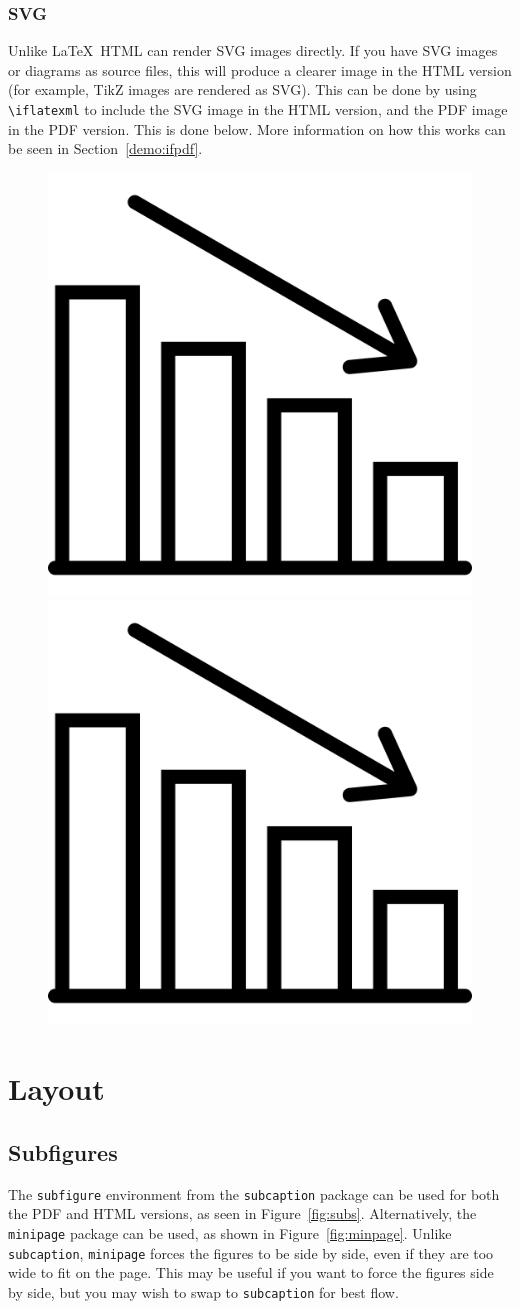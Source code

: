 \subsubsection{SVG}
\label{demo:fig:svg}

Unlike \LaTeX\, HTML can render SVG images directly. If you have SVG images or diagrams as source files, this will produce a clearer image in the HTML version (for example, TikZ images are rendered as SVG). This can be done by using \verb|\iflatexml| to include the SVG image in the HTML version, and the PDF image in the PDF version. This is done below. More information on how this works can be seen in Section~\ref{demo:ifpdf}.

\begin{figure}[H]
    \centering
    \iflatexml
        \includegraphics[width=0.25\linewidth]{img/graph.svg}
    \else
        \includegraphics[width=0.25\linewidth]{img/graph.pdf}
    \fi
    \label{fig:graph}
\end{figure}



\section{Layout}
\label{demo:layout}

\subsection{Subfigures}
\label{demo:fig:subfig}

The \texttt{subfigure} environment from the \texttt{subcaption} package can be used for both the PDF and HTML versions, as seen in Figure~\ref{fig:subs}. Alternatively, the \texttt{minipage} package can be used, as shown in Figure~\ref{fig:minpage}. Unlike \texttt{subcaption}, \texttt{minipage} forces the figures to be side by side, even if they are too wide to fit on the page. This may be useful if you want to force the figures side by side, but you may wish to swap to \texttt{subcaption} for best flow. 

